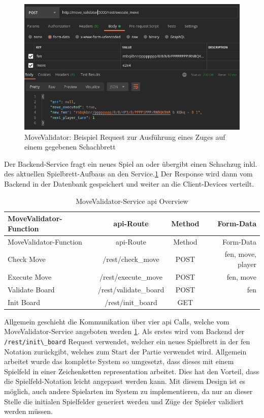 \begin{figure}
\centering
\includegraphics{images/ATC_movevalidator_execute_move.png}
\caption{MoveValidator: Beispiel Request zur Ausführung eines Zuges auf
einem gegebenen Schachbrett \label{ATC_movevalidator_execute_move}}
\end{figure}

Der Backend-Service fragt ein neues Spiel an oder übergibt einen
Schachzug inkl. des aktuellen Spielbrett-Aufbaus an den
Service.\ref{ATC_movevalidator_execute_move} Der Response wird dann vom
Backend in der Datenbank gespeichert und weiter an die Client-Devices
verteilt.

\begin{longtable}[]{@{}lccr@{}}
\caption{MoveValidator-Service \gls{api} Overview
\label{finalfeaturesatc}}\tabularnewline
\toprule
MoveValidator-Function & \gls{api}-Route & Method &
Form-Data\tabularnewline
\midrule
\endfirsthead
\toprule
MoveValidator-Function & \gls{api}-Route & Method &
Form-Data\tabularnewline
\midrule
\endhead
Check Move & /rest/check\_move & POST & fen, move, player\tabularnewline
Execute Move & /rest/execute\_move & POST & fen, move\tabularnewline
Validate Board & /rest/validate\_board & POST & fen\tabularnewline
Init Board & /rest/init\_board & GET &\tabularnewline
\bottomrule
\end{longtable}

Allgemein geschieht die Kommunikation über vier \gls{api} Calls, welche
vom MoveValidator-Service angeboten werden \ref{finalfeaturesatc}. Als
erstes wird vom Backend der \passthrough{\lstinline!/rest/init\_board!}
Request verwendet, welcher ein neues Spielbrett in der \gls{fen}
Notation zurückgibt, welches zum Start der Partie verwendet wird.
Allgemein arbeitet wurde das komplette System so umgesetzt, dass dieses
mit einem Spielfeld in einer Zeichenketten representation arbeitet. Dies
hat den Vorteil, dass die Spielfeld-Notation leicht angepasst werden
kann. Mit diesem Design ist es möglich, auch andere Spielarten im System
zu implementieren, da nur an dieser Stelle die initialen Spielfelder
generiert werden und Züge der Spieler validiert werden müssen.

